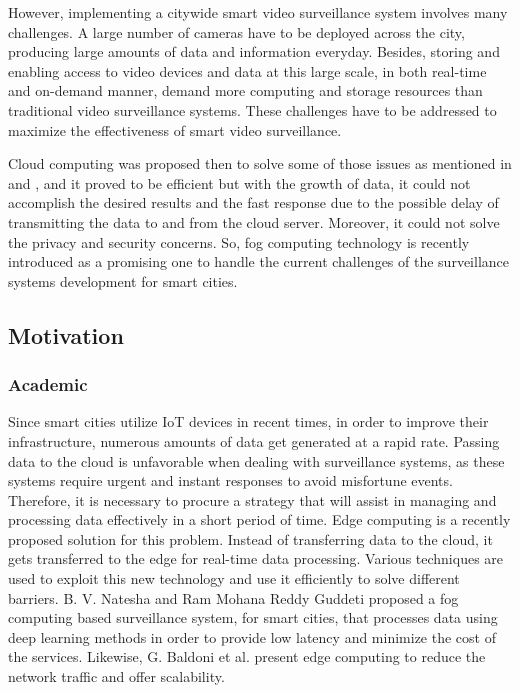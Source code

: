 \documentclass[12pt]{article}
\begin{document}
However, implementing a citywide smart video surveillance system involves many challenges. A large number of cameras have to be deployed across the city, producing large amounts of data and information everyday. Besides, storing and enabling access to video devices and data at this large scale, in both real-time and on-demand manner, demand more computing and storage resources than traditional video surveillance systems. These challenges have to be addressed to maximize the effectiveness of smart video surveillance\cite{1}. 

Cloud computing was proposed then to solve some of those issues as mentioned in \cite{2} and \cite{3}, and it proved to be efficient but with the growth of data, it could not accomplish the desired results and the fast response due to the possible delay of transmitting the data to and from the cloud server. Moreover, it could not solve the privacy and security concerns. So, fog computing technology is recently introduced as a promising one to handle the current challenges of the surveillance systems development for smart cities.

\subsection{Motivation}
\subsubsection{Academic}
Since smart cities utilize IoT devices in recent times, in order to improve their infrastructure, numerous amounts of data get generated at a rapid rate. Passing data to the cloud is unfavorable when dealing with surveillance systems, as these systems require urgent and  instant responses to avoid misfortune events. Therefore, it is necessary to procure a strategy that will assist in managing and processing data effectively in a short period of time. Edge computing is a recently proposed solution for this problem. Instead of transferring data to the cloud, it gets transferred to the edge for real-time data processing. Various techniques are used to exploit this new technology and use it efficiently to solve different barriers. B. V. Natesha and Ram Mohana Reddy Guddeti \cite{nateshafog} proposed a fog computing based surveillance system, for smart cities, that processes data using deep learning methods in order to provide low latency and minimize the cost of the services. Likewise, G. Baldoni et al. \cite{baldoni2017dynamic} present edge computing to reduce the network traffic and offer scalability.
\end{document}
